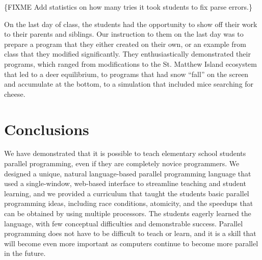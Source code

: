 \documentclass{sig-alternate}
\newcommand{\FIXME}[1]{{\color{red}\{FIXME #1\}}}
\begin{document}
\FIXME{Add statistics on how many tries it took students to fix parse errors.}

On the last day of class, the students had the opportunity to show off their work to their
parents and siblings. Our instruction to them on the last day was to prepare a program that
they either created on their own, or an example from class that they modified significantly.
They enthusiastically demonstrated their programs, which ranged from modifications to the St.
Matthew Island ecosystem that led to a deer equilibrium, to programs that had snow ``fall'' on
the screen and accumulate at the bottom, to a simulation that included mice searching for cheese.

\section{Conclusions}
We have demonstrated that it is possible to teach elementary school students parallel programming,
even if they are completely novice programmers.  We designed a unique, natural language-based parallel 
programming language that used a single-window, web-based interface to streamline teaching and
student learning, and we provided a curriculum that taught the students basic parallel programming
ideas, including race conditions, atomicity, and the speedups that can be obtained by using
multiple processors.  The students eagerly learned the language, with few conceptual difficulties
and demonstrable success.  Parallel programming does not have to be difficult to teach or learn,
and it is a skill that will become even more important as computers continue to become more
parallel in the future.



%
\small{

}
%
%
\end{document}
